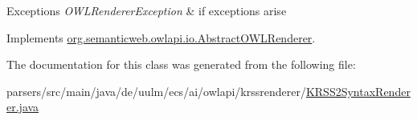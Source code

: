 \begin{DoxyExceptions}{Exceptions}
{\em O\-W\-L\-Renderer\-Exception} & if exceptions arise \\
\hline
\end{DoxyExceptions}


Implements \hyperlink{classorg_1_1semanticweb_1_1owlapi_1_1io_1_1_abstract_o_w_l_renderer_af63991e15c4b152e1f8013582c119bf5}{org.\-semanticweb.\-owlapi.\-io.\-Abstract\-O\-W\-L\-Renderer}.



The documentation for this class was generated from the following file\-:\begin{DoxyCompactItemize}
\item 
parsers/src/main/java/de/uulm/ecs/ai/owlapi/krssrenderer/\hyperlink{_k_r_s_s2_syntax_renderer_8java}{K\-R\-S\-S2\-Syntax\-Renderer.\-java}\end{DoxyCompactItemize}
